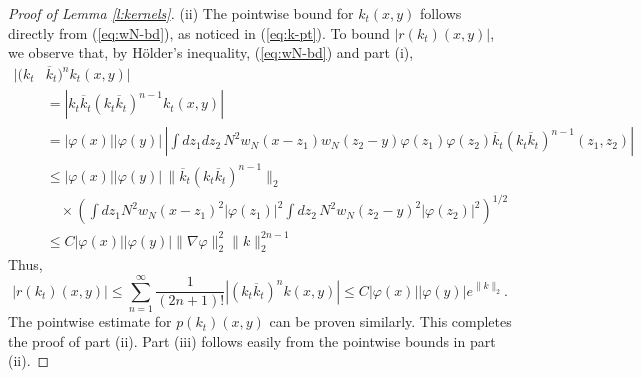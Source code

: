 \documentclass[11pt,a4paper]{article}
\begin{document}
\begin{proof}[Proof of Lemma \ref{l:kernels}]
(ii) The pointwise bound for $k_t(x,y)$ follows directly from (\ref{eq:wN-bd}), as noticed in (\ref{eq:k-pt}). To bound $\lvert r (k_t) (x,y)\rvert$, we observe that, by H\"older's inequality, (\ref{eq:wN-bd}) and part (i),
  \begin{align*}
    |( k_t &\overline{k}_t)^n k_t(x,y)| \\ & = | k_t \overline{k}_t ( k_t \overline{k}_t)^{n-1}
    k_t (x,y)| \\
    & = |\varphi(x)| |\varphi(y)| \, \left| \int dz_1 dz_2 \, N^2 w_N(x-z_1)
    w_N(z_2-y) \varphi(z_1) \varphi(z_2) \overline{k}_t (k_t
    \overline{k}_t)^{n-1}(z_1,z_2) \right| \\
    & \le |\varphi(x)| |\varphi(y)| \, \| \overline{k}_t (k_t \overline{k}_t)^{n-1}
    \|_{2} \\
    & \quad \times \left( \int dz_1 N^2 w_N(x-z_1)^2 |\varphi(z_1)|^2 \int
    dz_2 \, N^2 w_N(z_2-y)^2 |\varphi(z_2)|^2 \right)^{1/2} \\
    & \le C |\varphi(x)| |\varphi(y)|  \| \nabla \varphi \|_{2}^2 \| k
    \|_{2}^{2n-1}
  \end{align*}
  Thus,
  \[
    |r(k_t) (x,y)| \le \sum_{n=1}^\infty \frac{1}{(2n+1)!} |( k_t \overline{k}_t)^n k
    (x,y)|\le C |\varphi(x)| |\varphi(y)| e^{\| k \|_2}.
  \]
  The pointwise estimate for $p (k_t) (x,y)$ can be proven similarly. 
  This completes the proof of part (ii). Part (iii) follows easily from the pointwise bounds in part (ii).
\end{proof}
\end{document}
